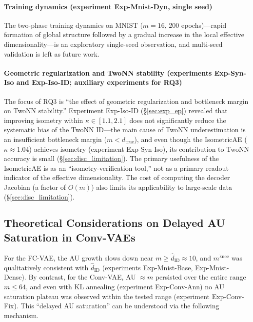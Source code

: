 \documentclass[make,article,submit,pdftex,moreauthors]{Definitions/mdpi}
\newcommand{\kap}{\kappa}
\newcommand{\mknee}{m^{\mathrm{knee}}}
\begin{document}
\paragraph{Training dynamics (experiment Exp-Mnist-Dyn, single seed)}
The two-phase training dynamics on MNIST ($m=16$, 200 epochs)---rapid formation of
global structure followed by a gradual increase in the local effective
dimensionality---is an exploratory single-seed observation, and multi-seed validation
is left as future work.

\paragraph{Geometric regularization and TwoNN stability (experiments Exp-Syn-Iso and Exp-Iso-ID; auxiliary experiments for RQ3)}
The focus of RQ3 is ``the effect of geometric regularization and bottleneck margin on
TwoNN stability.''
Experiment Exp-Iso-ID (\S\ref{sec:exp_ep}) revealed that improving isometry within
$\kap \in [1.1, 2.1]$ does not significantly reduce the systematic bias of the TwoNN
ID---the main cause of TwoNN underestimation is an insufficient bottleneck margin
($m < d_\mathrm{true}$), and even though the IsometricAE ($\kap \approx 1.04$) achieves
isometry (experiment Exp-Syn-Iso), its contribution to TwoNN accuracy is small
(\S\ref{sec:disc_limitation}).
The primary usefulness of the IsometricAE is as an ``isometry-verification tool,'' not
as a primary readout indicator of the effective dimensionality.
The cost of computing the decoder Jacobian (a factor of $O(m)$) also limits its
applicability to large-scale data (\S\ref{sec:disc_limitation}).

\subsection{Theoretical Considerations on Delayed AU Saturation in Conv-VAEs}\label{sec:disc_convvae}

For the FC-VAE, the AU growth slows down near $m \geq \hat{d}_\mathrm{ID} \approx 10$,
and $\mknee$ was qualitatively consistent with $\hat{d}_\mathrm{ID}$ (experiments
Exp-Mnist-Base, Exp-Mnist-Dense).
By contrast, for the Conv-VAE, AU $\approx m$ persisted over the entire range
$m \leq 64$, and even with KL annealing (experiment Exp-Conv-Ann) no AU saturation
plateau was observed within the tested range (experiment Exp-Conv-Fix).
This ``delayed AU saturation'' can be understood via the following mechanism.
\end{document}

